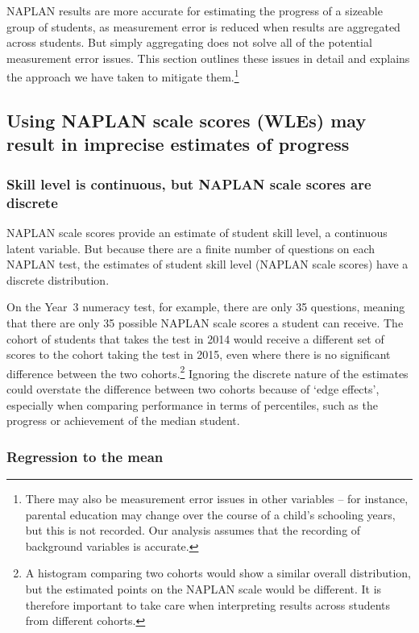 NAPLAN results are more accurate for estimating the progress of a sizeable group of students, as measurement error is reduced when results are aggregated across students. But simply aggregating does not solve all of the potential measurement error issues. This section outlines these issues in detail and explains the approach we have taken to mitigate them.\footnote{There may also be measurement error issues in other variables -- for instance, parental education may change over the course of a child's schooling years, but this is not recorded. Our analysis assumes that the recording of background variables is accurate.}

\subsection{Using NAPLAN scale scores (WLEs) may result in imprecise estimates of progress} \label{sec:rttm}

\subsubsection*{Skill level is continuous, but NAPLAN scale scores are discrete}

NAPLAN scale scores provide an estimate of student skill level, a continuous latent variable. But because there are a finite number of questions on each NAPLAN test, the estimates of student skill level (NAPLAN scale scores) have a discrete distribution.

On the \mbox{Year 3} numeracy test, for example, there are only 35 questions, meaning that there are only 35 possible NAPLAN scale scores a student can receive. The cohort of students that takes the test in 2014 would receive a different set of scores to the cohort taking the test in 2015, even where there is no significant difference between the two cohorts.\footnote{A histogram comparing two cohorts would show a similar overall distribution, but the estimated points on the NAPLAN scale would be different. It is therefore important to take care when interpreting results across students from different cohorts.} Ignoring the discrete nature of the estimates could overstate the difference between two cohorts because of `edge effects', especially when comparing performance in terms of percentiles, such as the progress or achievement of the median student.

\subsubsection*{Regression to the mean}

